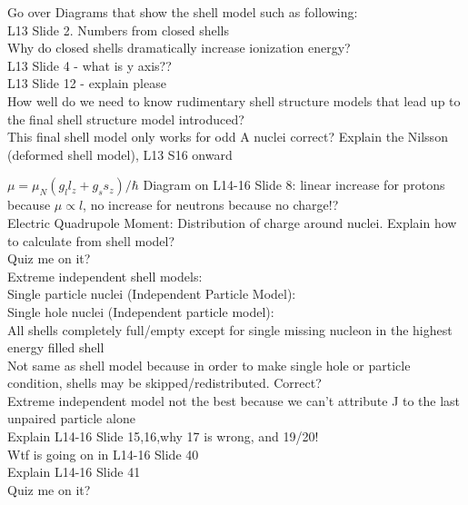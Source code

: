 \documentclass{article}
\begin{document}
\begin{multicols}{3}
Go over Diagrams that show the shell model such as following:\\
\hspace*{0.01\textwidth} L13 Slide 2.  Numbers from closed shells\\
\hspace*{0.01\textwidth} Why do closed shells dramatically increase ionization energy?\\
\hspace*{0.01\textwidth} L13 Slide 4 - what is y axis?? \\
\hspace*{0.01\textwidth} L13 Slide 12 - explain please\\
\hspace*{0.01\textwidth} How well do we need to know rudimentary shell structure models that lead up to the final shell structure model introduced?\\
\hspace*{0.01\textwidth} This final shell model only works for odd A nuclei correct?
\hspace*{0.01\textwidth} Explain the Nilsson (deformed shell model), L13 S16 onward\

$\mu = \mu_{N}(g_{l}l_{z} + g_{s}s_{z}) / \hbar$
Diagram on L14-16 Slide 8: linear increase for protons because $\mu \propto l$, no increase for neutrons because no charge!?\\
Electric Quadrupole Moment: Distribution of charge around nuclei.  Explain how to calculate from shell model?\\

Quiz me on it?\\

Extreme independent shell models:\\
Single particle nuclei (Independent Particle Model):\\
\hspace*{0.01\textwidth} 
Single hole nuclei (Independent particle model):\\
\hspace*{0.01\textwidth} All shells completely full/empty except for single missing nucleon in the highest energy filled shell\\
\hspace*{0.01\textwidth} Not same as shell model because in order to make single hole or particle condition, shells may be skipped/redistributed.  Correct?\\
Extreme independent model not the best because we can't attribute J to the last unpaired particle alone\\
Explain L14-16 Slide 15,16,why 17 is wrong, and 19/20!\\
Wtf is going on in L14-16 Slide 40\\
Explain L14-16 Slide 41\\
Quiz me on it?\\


\end{multicols}
\end{document}
